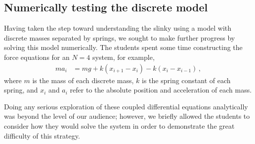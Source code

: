 \documentclass[prb,preprint,superscriptaddress]{revtex4-1}
\begin{document}

\subsection{Numerically testing the discrete model}
\label{subsec:forcesnumeric}

Having taken the step toward understanding the slinky using a model with
discrete masses separated by springs, we sought to make further progress by
solving this model numerically. The students spent some time constructing the
force equations for an $N=4$ system, for example,
\begin{align} \label{eq:coupleddes}
ma_i &= mg + k(x_{i+1} - x_i) - k(x_i - x_{i-1})
\,,\end{align}
where $m$ is the mass of each discrete mass, $k$ is the spring constant of each
spring, and $x_i$ and $a_i$ refer to the absolute position and acceleration of each mass.

Doing any serious exploration of these coupled differential equations
analytically was beyond the level of our audience; however, we briefly allowed
the students to consider how they would solve the system in order to demonstrate
the great difficulty of this strategy.
\end{document}
